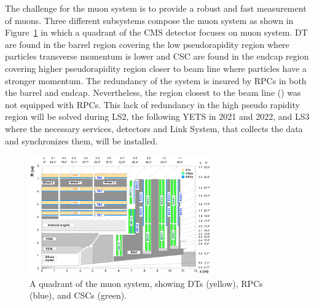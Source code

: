 	The challenge for the muon system is to provide a robust and fast measurement of muons. Three different subsystems compose the muon system as shown in Figure~\ref{fig:Quadrant} in which a quadrant of the CMS detector focuses on muon system. \acf{DT} are found in the barrel region covering the low pseudorapidity region where particles transverse momentum is lower and \acf{CSC} are found in the endcap region covering higher pseudorapidity region closer to beam line where particles have a stronger momentum. The redundancy of the system is insured by \acl{RPC}s in both the barrel and endcap. Nevertheless, the region closest to the beam line () was not equipped with RPCs. This lack of redundancy in the high pseudo rapidity region will be solved during LS2, the following \acf{YETS} in 2021 and 2022, and LS3 where the necessary services, detectors and Link System, that collects the data and synchronizes them, will be installed.

	\begin{figure}[H]
		\centering
		\includegraphics[width=0.7\textwidth]{fig/chapt2/Muon_quadrant.png}
		\caption{\label{fig:Quadrant} A quadrant of the muon system, showing DTs (yellow), RPCs (blue), and CSCs (green).}
	\end{figure}

\clearpage{\pagestyle{empty}\cleardoublepage}